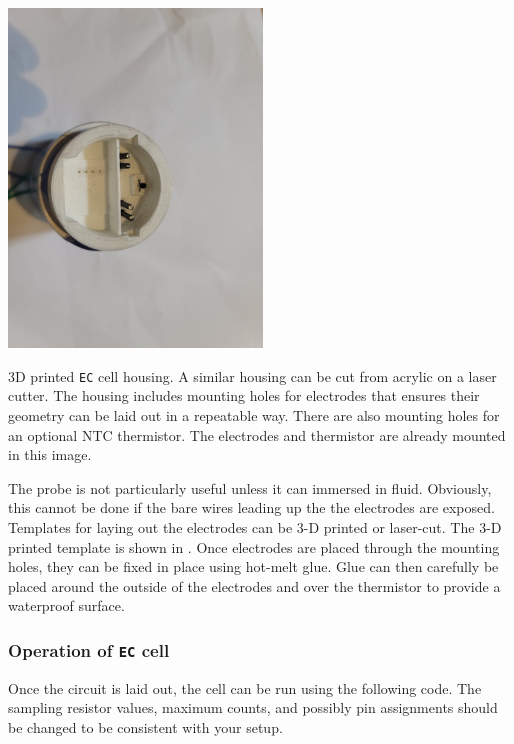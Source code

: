 \begin{marginfigure}[6cm]
	\begin{center}
		\includegraphics[height=9cm]{Images/AppendixB_cap}
		\caption[3-D printed \texttt{EC cell} housing]{3D printed \texttt{EC} cell housing. A similar housing can be cut from acrylic on a laser cutter. The housing includes mounting holes for electrodes that ensures their geometry can be laid out in a repeatable way. There are also mounting holes for an optional NTC thermistor. The electrodes and thermistor are already mounted in this image.}
	\end{center}
\end{marginfigure}

The probe is not particularly useful unless it can immersed in fluid. Obviously, this cannot be done if the bare wires leading up the the electrodes are exposed. Templates for laying out the electrodes can be 3-D printed or laser-cut.  The 3-D printed template is shown in . Once electrodes are placed through the mounting holes, they can be fixed in place using hot-melt glue. Glue can then carefully be placed around the outside of the electrodes and over the thermistor to provide a waterproof surface.

\subsubsection{Operation of \texttt{EC} cell}

Once the circuit is laid out, the cell can be run using the following code. The sampling resistor values, maximum \adc counts, and possibly pin assignments should be changed to be consistent with your setup.

